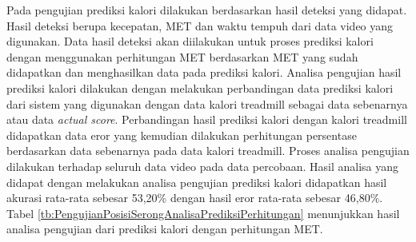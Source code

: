 Pada pengujian prediksi kalori dilakukan berdasarkan hasil deteksi yang didapat. Hasil deteksi berupa kecepatan, MET dan waktu tempuh dari data video yang digunakan. Data hasil deteksi akan diilakukan untuk proses prediksi kalori dengan menggunakan perhitungan MET berdasarkan MET yang sudah didapatkan dan menghasilkan data pada prediksi kalori. Analisa pengujian hasil prediksi kalori dilakukan dengan melakukan perbandingan data prediksi kalori dari sistem yang digunakan dengan data kalori treadmill sebagai data sebenarnya atau data \emph{actual score}. Perbandingan hasil prediksi kalori dengan kalori treadmill didapatkan data eror yang kemudian dilakukan perhitungan persentase berdasarkan data sebenarnya pada data kalori treadmill. Proses analisa pengujian dilakukan terhadap seluruh data video pada data percobaan. Hasil analisa yang didapat dengan melakukan analisa pengujian prediksi kalori didapatkan hasil akurasi rata-rata sebesar 53,20\% dengan hasil eror rata-rata sebesar 46,80\%. Tabel \ref{tb:PengujianPosisiSerongAnalisaPrediksiPerhitungan} menunjukkan hasil analisa pengujian dari prediksi kalori dengan perhitungan MET.

